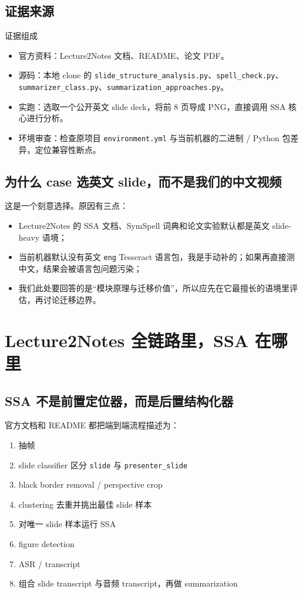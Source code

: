\documentclass[a4paper]{article}
\begin{document}
\subsection{证据来源}

\begin{methodbox}{证据组成}
\begin{itemize}
\item 官方资料：Lecture2Notes 文档、README、论文 PDF。
\item 源码：本地 clone 的 \texttt{slide\_structure\_analysis.py}、\texttt{spell\_check.py}、\texttt{summarizer\_class.py}、\texttt{summarization\_approaches.py}。
\item 实跑：选取一个公开英文 slide deck，将前 8 页导成 PNG，直接调用 SSA 核心进行分析。
\item 环境审查：检查原项目 \texttt{environment.yml} 与当前机器的二进制 / Python 包差异，定位兼容性断点。
\end{itemize}
\end{methodbox}

\subsection{为什么 case 选英文 slide，而不是我们的中文视频}

这是一个刻意选择。原因有三点：

\begin{itemize}
\item Lecture2Notes 的 SSA 文档、SymSpell 词典和论文实验默认都是英文 slide-heavy 语境；
\item 当前机器默认没有英文 \texttt{eng} Tesseract 语言包，我是手动补的；如果再直接测中文，结果会被语言包问题污染；
\item 我们此处要回答的是“模块原理与迁移价值”，所以应先在它最擅长的语境里评估，再讨论迁移边界。
\end{itemize}

\section{Lecture2Notes 全链路里，SSA 在哪里}

\subsection{SSA 不是前置定位器，而是后置结构化器}

官方文档和 README 都把端到端流程描述为：

\begin{enumerate}
\item 抽帧
\item slide classifier 区分 \texttt{slide} 与 \texttt{presenter\_slide}
\item black border removal / perspective crop
\item clustering 去重并挑出最佳 slide 样本
\item 对唯一 slide 样本运行 SSA
\item figure detection
\item ASR / transcript
\item 组合 slide transcript 与音频 transcript，再做 summarization
\end{enumerate}
\end{document}

